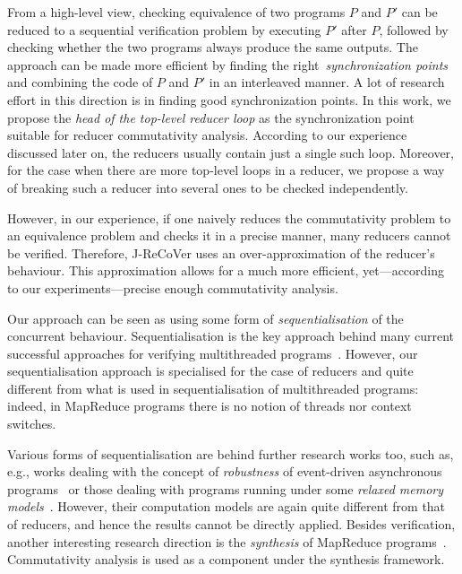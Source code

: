 \documentclass{llncs}
\begin{document}
From a high-level view, checking equivalence of two programs $P$ and $P'$ can be
reduced to a sequential verification problem by executing $P'$ after $P$,
followed by checking whether the two programs always produce the same outputs.
The approach can be made more efficient by finding the
right~\emph{synchronization points} and combining the code of $P$ and $P'$ in an
interleaved manner. A lot of research effort in this direction is in finding
good synchronization points. In this work, we propose the \emph{head of the
top-level reducer loop} as the synchronization point suitable for reducer
commutativity analysis. According to our experience discussed later on, the
reducers usually contain just a single such loop. Moreover, for the case when
there are more top-level loops in a reducer, we propose a way of breaking such a
reducer into several ones to be checked independently.

However, in our experience, if one naively reduces the commutativity problem to
an equivalence problem and checks it in a precise manner, many reducers cannot
be verified. Therefore, J-ReCoVer uses an over-approximation of the reducer's
behaviour. This approximation allows for a much more efficient, yet---according
to our experiments---precise enough commutativity analysis.

Our approach can be seen as using some form of \emph{sequentialisation} of the
concurrent behaviour. Sequentialisation is the key approach behind many current
successful approaches for verifying multithreaded
programs~\cite{LalReps:Seq:08,LazyCSeq14}. However, our sequentialisation
approach is specialised for the case of reducers and quite different from what
is used in sequentialisation of multithreaded programs: indeed, in MapReduce
programs there is no notion of threads nor context switches.

Various forms of sequentialisation are behind further research works too, such
as, e.g., works dealing with the concept of \emph{robustness} of event-driven
asynchronous programs~\cite{ahmed2017:robustness} or those dealing with programs
running under some \emph{relaxed memory
models}~\cite{ahmed2013:robustness,AbdullaACLR13,AbdullaACLR12}. However, their
computation models are again quite different from that of reducers, and hence
the results cannot be directly applied.
Besides verification, another interesting research direction is the
\emph{synthesis} of MapReduce programs~\cite{SmithA16}. Commutativity analysis
is used as a component under the synthesis framework.
\end{document}
